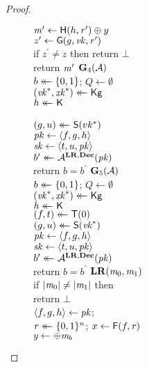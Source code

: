 \begin{proof}
\begin{figure}
{        $\ptxt^\prime \gets \hashf(h,\coins^\prime) \xor y$\\
        $z^\prime \gets \abof(g,\vk,\coins^\prime)$\\
        if $z^\prime \ne z$ then
          return $\bot$\\
        return $\ptxt^\prime$
    }
    {
      \underline{$\G_4(\advA)$}
          \hfill {}\\[2pt]
        $b \getsr \bits$; $Q \gets \emptyset$\\
        $(\vk^*, \xk^*) \getsr \siggen$\\
        $h \getsr \hashgen$\\
        \\
        $(g, u) \getsr \abogen(vk^*)$\\
        $\pk \gets \str{f, g, h}$\\
        $\sk \gets \str{t, u, \pk}$\\
        $b^\prime \getsr \advA^{\lro,\deco}(\pk)$\\
        return $b=b^\prime$
    }
    {
      \underline{$\G_5(\advA)$}\\[2pt]
        $b \getsr \bits$; $Q \gets \emptyset$\\
        $(\vk^*, \xk^*) \getsr \siggen$\\
        $h \getsr \hashgen$\\
        $(f, t) \getsr \losgen(0)$\\
        $(g, u) \getsr \abogen(\vk^*)$\\
        $\pk \gets \str{f, g, h}$\\
        $\sk \gets \str{t, u, \pk}$\\
        $b^\prime \getsr \advA^{\lro,\deco}(\pk)$\\
        return $b=b^\prime$
    }
    {
      \underline{$\lro(\ptxt_0, \ptxt_1)$}\\[2pt]
        if $|\ptxt_0| \ne |\ptxt_1|$ then\\
          \tab return $\bot$\\
        $\str{f, g, h} \gets \pk$;
        \\
        $\coins \getsr \bits^n$;
        $x \gets \losf(f,\coins)$\\
        $y \gets$$\xor \ptxt_b$\\
}
\end{figure}
\end{proof}
